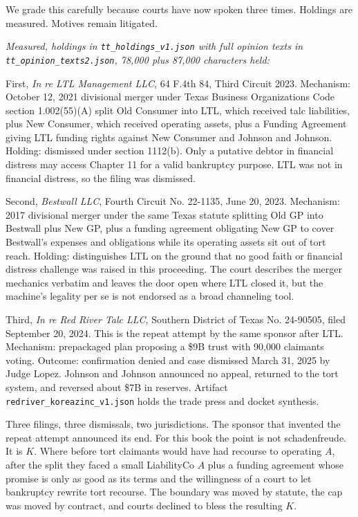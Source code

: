 We grade this carefully because courts have now spoken three times. Holdings are measured. Motives remain litigated.

\textit{Measured, holdings in \texttt{tt\_holdings\_v1.json} with full opinion texts in \texttt{tt\_opinion\_texts2.json}, 78,000 plus 87,000 characters held:}

First, \textit{In re LTL Management LLC}, 64 F.4th 84, Third Circuit 2023. Mechanism: October 12, 2021 divisional merger under Texas Business Organizations Code section 1.002(55)(A) split Old Consumer into LTL, which received talc liabilities, plus New Consumer, which received operating assets, plus a Funding Agreement giving LTL funding rights against New Consumer and Johnson and Johnson. Holding: dismissed under section 1112(b). Only a putative debtor in financial distress may access Chapter 11 for a valid bankruptcy purpose. LTL was not in financial distress, so the filing was dismissed.

Second, \textit{Bestwall LLC}, Fourth Circuit No. 22-1135, June 20, 2023. Mechanism: 2017 divisional merger under the same Texas statute splitting Old GP into Bestwall plus New GP, plus a funding agreement obligating New GP to cover Bestwall's expenses and obligations while its operating assets sit out of tort reach. Holding: distinguishes LTL on the ground that no good faith or financial distress challenge was raised in this proceeding. The court describes the merger mechanics verbatim and leaves the door open where LTL closed it, but the machine's legality per se is not endorsed as a broad channeling tool.

Third, \textit{In re Red River Talc LLC}, Southern District of Texas No. 24-90505, filed September 20, 2024. This is the repeat attempt by the same sponsor after LTL. Mechanism: prepackaged plan proposing a \$9B trust with 90,000 claimants voting. Outcome: confirmation denied and case dismissed March 31, 2025 by Judge Lopez. Johnson and Johnson announced no appeal, returned to the tort system, and reversed about \$7B in reserves. Artifact \texttt{redriver\_koreazinc\_v1.json} holds the trade press and docket synthesis.

Three filings, three dismissals, two jurisdictions. The sponsor that invented the repeat attempt announced its end. For this book the point is not schadenfreude. It is $K$. Where before tort claimants would have had recourse to operating $A$, after the split they faced a small LiabilityCo $A$ plus a funding agreement whose promise is only as good as its terms and the willingness of a court to let bankruptcy rewrite tort recourse. The boundary was moved by statute, the cap was moved by contract, and courts declined to bless the resulting $K$.

